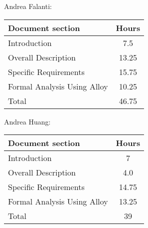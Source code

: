 Andrea Falanti:

\begin{tabular}{|l|c|}
    \hline
    Document section & Hours \\
    \hline
     Introduction & 7.5\\
     Overall Description & 13.25\\
     Specific Requirements & 15.75\\
     Formal Analysis Using Alloy & 10.25\\
     \hline
     Total & 46.75\\
     \hline
\end{tabular}
\vskip 0.3in

Andrea Huang:

\begin{tabular}{|l|c|}
    \hline
    Document section & Hours \\
    \hline
     Introduction &  7\\
     Overall Description & 4.0\\
     Specific Requirements & 14.75\\
     Formal Analysis Using Alloy & 13.25\\
     \hline
     Total & 39\\
     \hline
\end{tabular}